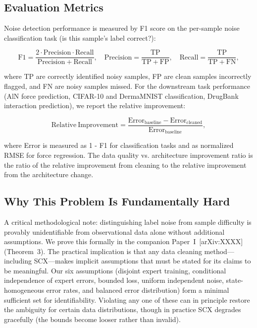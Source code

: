 \subsection{Evaluation Metrics}

Noise detection performance is measured by F1 score on the per-sample noise classification task (is this sample's label correct?):

\begin{equation}
\mathrm{F1} = \frac{2 \cdot \mathrm{Precision} \cdot \mathrm{Recall}}{\mathrm{Precision} + \mathrm{Recall}}, \quad
\mathrm{Precision} = \frac{\mathrm{TP}}{\mathrm{TP} + \mathrm{FP}}, \quad
\mathrm{Recall} = \frac{\mathrm{TP}}{\mathrm{TP} + \mathrm{FN}},
\label{eq:f1}
\end{equation}

where TP are correctly identified noisy samples, FP are clean samples incorrectly flagged, and FN are noisy samples missed. For the downstream task performance (AlN force prediction, CIFAR-10 and DermaMNIST classification, DrugBank interaction prediction), we report the relative improvement:

\begin{equation}
\mathrm{Relative~Improvement} = \frac{\mathrm{Error_{baseline}} - \mathrm{Error_{cleaned}}}{\mathrm{Error_{baseline}}},
\label{eq:relative_improvement}
\end{equation}

where Error is measured as 1 - F1 for classification tasks and as normalized RMSE for force regression. The data quality vs. architecture improvement ratio is the ratio of the relative improvement from cleaning to the relative improvement from the architecture change.

\subsection{Why This Problem Is Fundamentally Hard}

A critical methodological note: distinguishing label noise from sample difficulty is provably unidentifiable from observational data alone without additional assumptions. We prove this formally in the companion Paper~I~[arXiv:XXXX] (Theorem~3). The practical implication is that any data cleaning method---including SCX---makes implicit assumptions that must be stated for its claims to be meaningful. Our six assumptions (disjoint expert training, conditional independence of expert errors, bounded loss, uniform independent noise, state-homogeneous error rates, and balanced error distribution) form a minimal sufficient set for identifiability. Violating any one of these can in principle restore the ambiguity for certain data distributions, though in practice SCX degrades gracefully (the bounds become looser rather than invalid).

